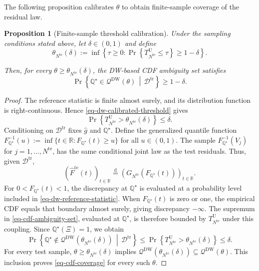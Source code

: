 \documentclass[review,11pt,3p,authoryear,nopreprintline]{elsarticle}
\newtheorem{proposition}{Proposition}
\begin{document}
The following proposition calibrates $\theta$ to obtain finite-sample coverage of the residual law.

\begin{proposition}[Finite-sample threshold calibration]
  \label{proposition-01}
  Under the sampling conditions stated above, let $\delta\in(0,1)$ and define
  \begin{equation}
    \theta_{N^{\mathrm{te}}}(\delta):=\inf\left\{\tau\ge0:\Pr\left\{T_{N^{\mathrm{te}}}^{\mathrm U}\le\tau\right\}\ge1-\delta\right\}.
    \label{eq-dw-calibrated-threshold}
  \end{equation}

  Then, for every $\theta\ge\theta_{N^{\mathrm{te}}}(\delta)$, the DW-based CDF ambiguity set satisfies
  \begin{equation}
    \Pr\left\{\mathbb Q^\star\in\mathcal Q^{\mathrm{DW}}(\theta)\,\middle|\,\mathcal D^{\mathrm{tr}}\right\}\ge1-\delta.
    \label{eq-cdf-coverage}
  \end{equation}
\end{proposition}
\begin{proof}
  The reference statistic is finite almost surely, and its distribution function is right-continuous. Hence \eqref{eq-dw-calibrated-threshold} gives
  \[
    \Pr\left\{T_{N^{\mathrm{te}}}^{\mathrm U}>\theta_{N^{\mathrm{te}}}(\delta)\right\}\le\delta.
  \]
  Conditioning on $\mathcal D^{\mathrm{tr}}$ fixes $\hat g$ and $\mathbb Q^\star$. Define the generalized quantile function $F_{\mathbb Q^\star}^{-1}(u):=\inf\{t\in\mathbb R:F_{\mathbb Q^\star}(t)\ge u\}$ for all $u\in(0,1)$. The sample $F_{\mathbb Q^\star}^{-1}(V_j)$ for $j=1,\ldots,N^{\mathrm{te}}$, has the same conditional joint law as the test residuals. Thus, given $\mathcal D^{\mathrm{tr}}$,
  \[
    \left(\widehat F^{\mathrm{te}}(t)\right)_{t\in\mathbb R}\overset{\mathrm d}{=}\left(G_{N^{\mathrm{te}}}\!\left(F_{\mathbb Q^\star}(t)\right)\right)_{t\in\mathbb R}.
  \]
  For $0<F_{\mathbb Q^\star}(t)<1$, the discrepancy at $\mathbb Q^\star$ is evaluated at a probability level included in \eqref{eq-dw-reference-statistic}. When $F_{\mathbb Q^\star}(t)$ is zero or one, the empirical CDF equals that boundary almost surely, giving discrepancy $-\infty$. The supremum in \eqref{eq-cdf-ambiguity-set}, evaluated at $\mathbb Q^\star$, is therefore bounded by $T_{N^{\mathrm{te}}}^{\mathrm U}$ under this coupling. Since $\mathbb Q^\star(\Xi)=1$, we obtain
  \[
    \Pr\left\{\mathbb Q^\star\notin\mathcal Q^{\mathrm{DW}}\!\left(\theta_{N^{\mathrm{te}}}(\delta)\right)\,\middle|\,\mathcal D^{\mathrm{tr}}\right\}
    \le\Pr\left\{T_{N^{\mathrm{te}}}^{\mathrm U}>\theta_{N^{\mathrm{te}}}(\delta)\right\}\le\delta.
  \]
  For every test sample, $\theta\ge\theta_{N^{\mathrm{te}}}(\delta)$ implies $\mathcal Q^{\mathrm{DW}}\!\left(\theta_{N^{\mathrm{te}}}(\delta)\right)\subseteq\mathcal Q^{\mathrm{DW}}(\theta)$. This inclusion proves \eqref{eq-cdf-coverage} for every such $\theta$.
\end{proof}
\end{document}
